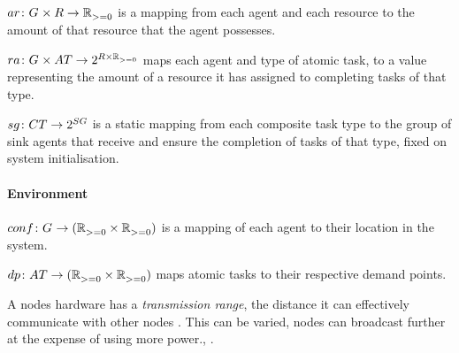 $\formalAgentResources{}{}$ is a mapping from each agent and each resource to the amount of that resource that the agent possesses.

$\formalTaskResourceAllocation{}{}$ maps each agent and type of atomic task, to a value representing the amount of a resource it has assigned to completing tasks of that type.


$\formalSinkMapping{}{}$ is a static mapping from each composite task type to the group of sink agents that receive and ensure the completion of tasks of that type, fixed on system initialisation.


\paragraph{Environment}
$\formalDeployment{}{}$ is a mapping of each agent to their location in the system.

$\formalTaskDemandPoint{}{}$ maps atomic tasks to their respective demand points.

A nodes hardware has a \textit{transmission range}, the distance it can effectively communicate with other nodes \cite{Radman201}. This can be varied, nodes can broadcast further at the expense of using more power., \cite{Padmanabh2008, Song2009}.
